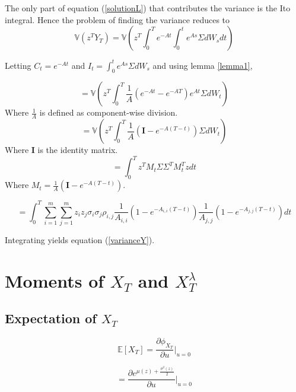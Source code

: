 \documentclass[12pt]{article}
\theoremstyle{definition}
\begin{document}
The only part of equation (\ref{solutionL}) that contributes the variance is the Ito integral.  Hence the problem of finding the variance reduces to 
\begin{equation}
\mathbb{V}(z^T Y_T)=\mathbb{V}\left(z^T \int_0 ^ T e^{-At} \int_ 0 ^ t e^{As} \Sigma dW_s dt \right)
\end{equation}

Letting \(C_t=e^{-At}\) and \(I_t=\int_ 0 ^ t e^{As} \Sigma dW_s \) and using lemma \ref{lemma1},

\begin{equation}
=\mathbb{V}\left(z^T  \int_ 0 ^ T \frac{1}{A}\left( e^{-At} -e^{-AT} \right) e^{At}\Sigma dW_t  \right)
\end{equation}
Where \(\frac{1}{A}\) is defined as component-wise division.
\begin{equation}
=\mathbb{V}\left(z^T  \int_ 0 ^ T \frac{1}{A}\left( \mathbf{I}-e^{-A(T-t)} \right)\Sigma dW_t  \right)
\end{equation}
Where  \(\mathbf{I}\) is the identity matrix.
\begin{equation}
=\int_ 0 ^ T z^T M_t \Sigma \Sigma ^T M_t^T z dt  
\end{equation}
Where \(M_t=\frac{1}{A}\left( \mathbf{I}-e^{-A(T-t)} \right)\).

\begin{equation}
=\int_0 ^ T \sum_{i=1} ^ m \sum_{j=1} ^ m z_i z_j \sigma_i \sigma_j \rho_{i,j} \frac{1}{A_{i,i}}\left(1-e^{-{A}_{i, i}(T-t)}\right)\frac{1}{A_{j,j}}\left(1-e^{-{A}_{j, j}(T-t)}\right) dt\end{equation}

Integrating yields equation (\ref{varianceY}).
\section{Moments of \(X_T\) and \(X_T ^ \lambda\)} \label{mX}

\subsection{Expectation of \(X_T\)}

\begin{equation}
\mathbb{E}[X_T]=\frac{\partial \phi_{X_T}}{\partial u} \big|_{u=0}
\end{equation}

\begin{equation}
 =\frac{\partial e^{\mu(z)+\frac{\sigma^2(z)}{2} }}{\partial u} \bigg|_{u=0}\end{equation}
 
\end{document}
